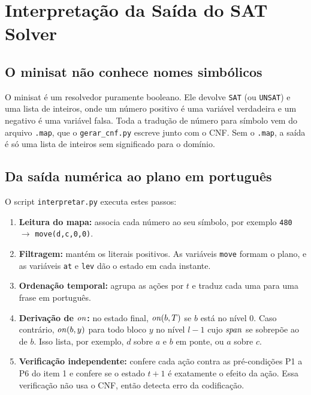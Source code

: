 \section{Interpretação da Saída do SAT Solver}

\subsection{O minisat não conhece nomes simbólicos}
O minisat é um resolvedor puramente booleano. Ele devolve \texttt{SAT} (ou \texttt{UNSAT}) e uma lista de inteiros, onde um número positivo é uma variável verdadeira e um negativo é uma variável falsa. Toda a tradução de número para símbolo vem do arquivo \texttt{.map}, que o \texttt{gerar\_cnf.py} escreve junto com o CNF. Sem o \texttt{.map}, a saída é só uma lista de inteiros sem significado para o domínio.

\subsection{Da saída numérica ao plano em português}
O script \texttt{interpretar.py} executa estes passos:
\begin{enumerate}
\item \textbf{Leitura do mapa:} associa cada número ao seu símbolo, por exemplo \texttt{480} $\to$ \lstinline|move(d,c,0,0)|.
\item \textbf{Filtragem:} mantém os literais positivos. As variáveis \lstinline|move| formam o plano, e as variáveis \lstinline|at| e \lstinline|lev| dão o estado em cada instante.
\item \textbf{Ordenação temporal:} agrupa as ações por $t$ e traduz cada uma para uma frase em português.
\item \textbf{Derivação de $\mathit{on}$:} no estado final, $\mathit{on}(b,T)$ se $b$ está no nível 0. Caso contrário, $\mathit{on}(b,y)$ para todo bloco $y$ no nível $l-1$ cujo $\mathit{span}$ se sobrepõe ao de $b$. Isso lista, por exemplo, $d$ sobre $a$ e $b$ em ponte, ou $a$ sobre $c$.
\item \textbf{Verificação independente:} confere cada ação contra as pré-condições P1 a P6 do item 1 e confere se o estado $t+1$ é exatamente o efeito da ação. Essa verificação não usa o CNF, então detecta erro da codificação.
\end{enumerate}

